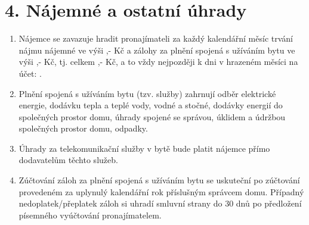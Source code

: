 \section*{4. Nájemné a ostatní úhrady}

\begin{enumerate}[label=\arabic*.]
    \item Nájemce se zavazuje hradit pronajímateli za každý kalendářní měsíc trvání nájmu nájemné ve výši \Rentrentamount,- Kč a zálohy za plnění spojená s užíváním bytu ve výši \Rentservicesamount,- Kč, tj. celkem \Renttotalamount,- Kč, a to vždy nejpozději k \Rentpaymentday dni v hrazeném měsíci na účet: \Rentbankaccount.
    \item Plnění spojená s užíváním bytu (tzv. služby) zahrnují odběr elektrické energie, dodávku tepla a teplé vody, vodné a stočné, dodávky energií do společných prostor domu, úhrady spojené se správou, úklidem a údržbou společných prostor domu, odpadky.
    \item Úhrady za telekomunikační služby v bytě bude platit nájemce přímo dodavatelům těchto služeb.
    \item Zúčtování záloh za plnění spojená s užíváním bytu se uskuteční po zúčtování provedeném za uplynulý kalendářní rok příslušným správcem domu. Případný nedoplatek/přeplatek záloh si uhradí smluvní strany do 30 dnů po předložení písemného vyúčtování pronajímatelem.
\end{enumerate}
